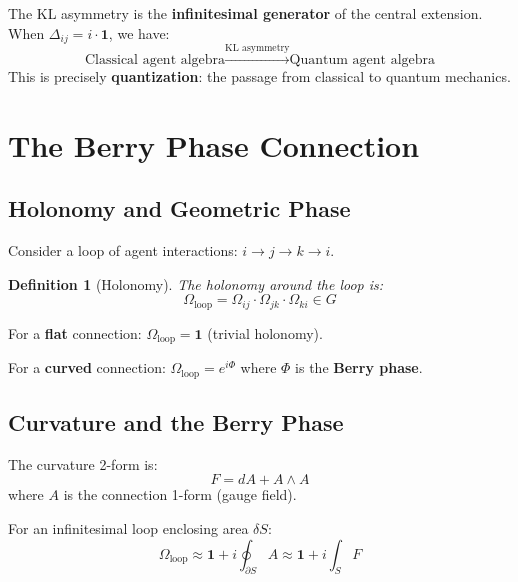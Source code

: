 \documentclass[11pt,a4paper]{article}
\newtheorem{definition}[theorem]{Definition}
\newcommand{\id}{\mathbf{1}}
\begin{document}
\begin{physicalinsight}
The KL asymmetry is the \textbf{infinitesimal generator} of the central extension. When $\Delta_{ij} = i \cdot \id$, we have:
\begin{equation}
    \text{Classical agent algebra} \xrightarrow{\text{KL asymmetry}} \text{Quantum agent algebra}
\end{equation}
This is precisely \textbf{quantization}: the passage from classical to quantum mechanics.
\end{physicalinsight}

\section{The Berry Phase Connection}

\subsection{Holonomy and Geometric Phase}

Consider a loop of agent interactions: $i \to j \to k \to i$.

\begin{definition}[Holonomy]
The holonomy around the loop is:
\begin{equation}
    \Omega_{\text{loop}} = \Omega_{ij} \cdot \Omega_{jk} \cdot \Omega_{ki} \in G
\end{equation}
\end{definition}

For a \textbf{flat} connection: $\Omega_{\text{loop}} = \id$ (trivial holonomy).

For a \textbf{curved} connection: $\Omega_{\text{loop}} = e^{i\Phi}$ where $\Phi$ is the \textbf{Berry phase}.

\subsection{Curvature and the Berry Phase}

The curvature 2-form is:
\begin{equation}
    F = dA + A \wedge A
\end{equation}
where $A$ is the connection 1-form (gauge field).

For an infinitesimal loop enclosing area $\delta S$:
\begin{equation}
    \Omega_{\text{loop}} \approx \id + i \oint_{\partial S} A \approx \id + i \int_S F
\end{equation}
\end{document}
